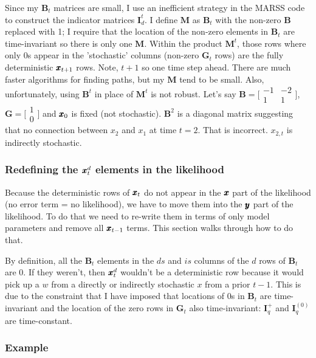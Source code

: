 \documentclass[]{article}
\def\BB{\mbox{$\mathbf B$}}	\def\bb{\mbox{$\mathbf b$}}
\def\GG{\mbox{$\mathbf G$}}	\def\gg{\mbox{$\mathbf g$}}
\def\II{\mbox{$\mathbf I$}} \def\ii{\mbox{$\mathbf i$}}
\def\MM{\mbox{$\mathbf M$}}  \def\mm{\mbox{$\mathbf m$}}
\begin{document}
Since my $\BB_t$ matrices are small, I use an  inefficient strategy in the MARSS code to construct the indicator matrices $\II_d^t$.  I define $\MM$ as $\BB_t$ with the non-zero $\BB$ replaced with 1; I require that the location of the non-zero elements in $\BB_t$ are time-invariant so there is only one $\MM$.  Within the product $\MM^t$, those rows where only 0s appear in the 'stochastic' columns (non-zero $\GG_t$ rows) are the fully deterministic $\mbox{$\pmb{x}$}_{t+1}$ rows. Note, $t+1$ so one time step ahead.  There are much faster algorithms for finding paths, but my $\MM$ tend to be small.  Also, unfortunately, using $\BB^t$ in place of $\MM^t$ is not robust. Let's say $\BB=\bigl[ \begin{smallmatrix}-1&-2\\ 1&1\end{smallmatrix} \bigr]$, $\GG=\bigl[ \begin{smallmatrix}1\\ 0\end{smallmatrix} \bigr]$ and $\mbox{$\pmb{x}$}_0$ is fixed (not stochastic).
$\BB^2$ is a diagonal matrix suggesting that no connection between $x_2$ and $x_1$ at time $t=2$. That is incorrect. $x_{2,t}$ is indirectly stochastic.

\subsubsection{Redefining the $\mbox{$\pmb{x}$}_t^d$ elements in the likelihood}
Because the deterministic rows of $\mbox{$\pmb{x}$}_t$ do not appear in the $\mbox{$\pmb{x}$}$ part of the likelihood (no error term = no likelihood), we have to move them into the $\mbox{$\pmb{y}$}$ part of the likelihood. To do that we need to re-write them in terms of only model parameters and remove all $\mbox{$\pmb{x}$}_{t-1}$ terms. This section walks through how to do that.

By definition, all the $\BB_t$ elements in the $ds$ and $is$ columns of the $d$ rows of $\BB_t$ are 0. If they weren't, then $\mbox{$\pmb{x}$}_t^d$ wouldn't be a deterministic row because it would pick up a $w$ from a directly or indirectly stochastic $x$ from a prior $t-1$.  This is due to the constraint that I have imposed that locations of 0s in $\BB_t$ are time-invariant and the location of the zero rows in $\GG_t$ also time-invariant: $\II_q^{+}$ and $\II_q^{(0)}$ are time-constant. 

\subsubsection*{Example}
\end{document}
